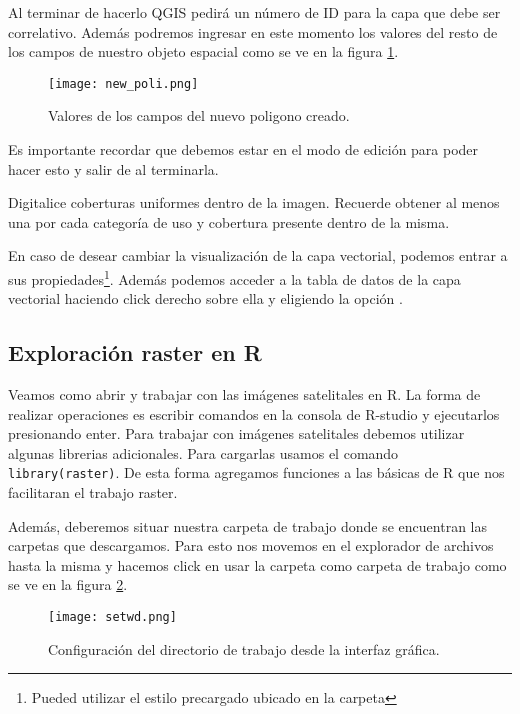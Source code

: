 Al terminar de hacerlo QGIS pedir\'a un n\'umero de ID para la capa que debe ser
correlativo. Además podremos ingresar en este momento los valores del resto de
los campos de nuestro objeto espacial como se ve en la figura \ref{fig:newpoli}.

\begin{figure}[h!]
\begin{center}
\texttt{[image: new\_poli.png]}
\end{center}
\caption{Valores de los campos del nuevo poligono creado.}
\label{fig:newpoli}
\end{figure}

Es importante recordar que debemos estar en el modo de edici\'on para poder hacer
esto y salir de al terminarla.

\begin{act}
   Digitalice coberturas uniformes dentro de la imagen. Recuerde obtener al
   menos una por cada categor\'ia de uso y cobertura presente dentro de la misma.
\end{act}

En caso de desear cambiar la visualizaci\'on de la capa vectorial, podemos entrar
a sus propiedades\footnote{Pueded utilizar el estilo precargado
ubicado en la carpeta }. Adem\'as podemos acceder a la tabla de
datos de la capa vectorial haciendo click derecho sobre ella y eligiendo la
opci\'on .

\subsection{Exploraci\'on raster en R}

Veamos como abrir y trabajar con las im\'agenes satelitales en R. La forma de
realizar operaciones es escribir comandos en la consola de R-studio y
ejecutarlos presionando enter. Para trabajar con im\'agenes satelitales debemos utilizar
algunas librerias adicionales. Para cargarlas usamos el comando
\texttt{library(raster)}. De esta forma agregamos funciones a las b\'asicas de
R que nos facilitaran el trabajo raster.

Adem\'as, deberemos situar nuestra carpeta de trabajo donde se encuentran las
carpetas que descargamos. Para esto nos movemos en el explorador de archivos
hasta la misma y hacemos click en usar la carpeta como carpeta de trabajo como
se ve en la figura \ref{fig:setwd}.

\begin{figure}[h!]
\begin{center}
    \texttt{[image: setwd.png]}
\end{center}
\caption{Configuraci\'on del directorio de trabajo desde la interfaz gr\'afica.}
\label{fig:setwd}
\end{figure}

